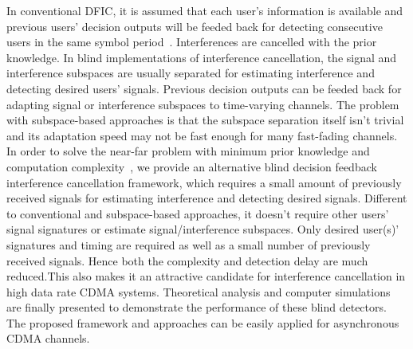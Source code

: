 \documentclass[a4paper,10pt,fleqn, twocolumn]{IEEETran}
\begin{document}
In conventional DFIC, it is assumed that each user's information
is available and previous users' decision outputs will be feeded
back for detecting consecutive users in the same symbol
period~\cite{Verd98}. Interferences are cancelled with the prior
knowledge. In blind implementations of interference cancellation,
the signal and interference subspaces are usually separated for
estimating interference and detecting desired users' signals.
Previous decision outputs can be feeded back for adapting signal
or interference subspaces to time-varying channels. The problem
with subspace-based approaches is that the subspace separation
itself isn't trivial and its adaptation speed may not be fast
enough for many fast-fading channels. In order to solve the
near-far problem with minimum prior knowledge and computation
complexity~\cite{Wang03d,Wang05A}, we provide an alternative blind
decision feedback interference cancellation framework, which
requires a small amount of previously received signals for
estimating interference and detecting desired signals. Different
to conventional and subspace-based approaches, it doesn't require
other users' signal signatures or estimate signal/interference
subspaces. Only desired user(s)' signatures and timing are
required as well as a small number of previously received signals.
Hence both the complexity and detection delay are much
reduced.This also makes it an attractive candidate for
interference cancellation in high data rate CDMA systems.
Theoretical analysis and computer simulations are finally
presented to demonstrate the performance of these blind detectors.
The proposed framework and approaches can be easily applied for
asynchronous CDMA channels.
\end{document}
